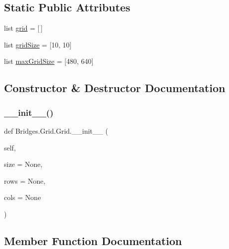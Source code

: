 \subsection*{Static Public Attributes}
\begin{DoxyCompactItemize}
\item 
list \mbox{\hyperlink{class_bridges_1_1_grid_1_1_grid_abe5f95802dde51888b47f465caa63d76}{grid}} = \mbox{[}$\,$\mbox{]}
\item 
list \mbox{\hyperlink{class_bridges_1_1_grid_1_1_grid_ace0915cd8922ad37d390e08a3a370700}{grid\+Size}} = \mbox{[}10, 10\mbox{]}
\item 
list \mbox{\hyperlink{class_bridges_1_1_grid_1_1_grid_aca620cf7545089b3bb603a7bd035afd6}{max\+Grid\+Size}} = \mbox{[}480, 640\mbox{]}
\end{DoxyCompactItemize}


\subsection{Constructor \& Destructor Documentation}
\mbox{\label{class_bridges_1_1_grid_1_1_grid_a5a0a993fcdb28d59bfc32024a7dea0ae}} 
\subsubsection{\texorpdfstring{\+\_\+\+\_\+init\+\_\+\+\_\+()}{\_\_init\_\_()}}
{\footnotesize\ttfamily def Bridges.\+Grid.\+Grid.\+\_\+\+\_\+init\+\_\+\+\_\+ (\begin{DoxyParamCaption}\item[{}]{self,  }\item[{}]{size = {\ttfamily None},  }\item[{}]{rows = {\ttfamily None},  }\item[{}]{cols = {\ttfamily None} }\end{DoxyParamCaption})}



\subsection{Member Function Documentation}
\mbox{\label{class_bridges_1_1_grid_1_1_grid_ae4848ca073fcc0b8e657b2bd5cd5efa4}} 
